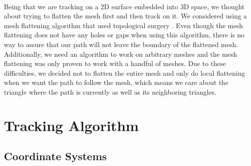 \documentclass[conference]{acmsiggraph}
\begin{document}
\\
Being that we are tracking on a 2D surface embedded into 3D space, we thought about trying to flatten the mesh first and then track on it. We considered using a mesh flattening algorithm that used topological surgery \cite{meshunfolding}. Even though the mesh flattening does not have any holes or gaps when using this algorithm, there is no way to assure that our path will not leave the boundary of the flattened mesh. Additionally, we need an algorithm to work on arbitrary meshes and the mesh flattening was only proven to work with a handful of meshes. Due to these difficulties, we decided not to flatten the entire mesh and only do local flattening when we want the path to follow the mesh, which means we care about the triangle where the path is currently as well as its neighboring triangles. 

\section{Tracking Algorithm}

\subsection{Coordinate Systems}
\end{document}
